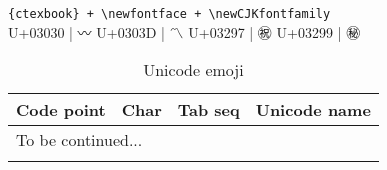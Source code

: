 \documentclass[oneside]{ctexbook} %
\begin{document}
\verb!{ctexbook} + \newfontface + \newCJKfontfamily! \\ 
U+03030 | {\EmojiFontTwo 〰}
U+0303D | {\EmojiFontTwo 〽}
U+03297 | {\EmojiFontTwo ㊗}
U+03299 | {\EmojiFontTwo ㊙}



\begin{longtable}{ccll}
    \caption{Unicode emoji} \\
    \toprule
    Code point & Char & Tab seq & Unicode name \\
    \hline \endhead
    \multicolumn{4}{l}{To be continued...} \\ 
    \midrule \endfoot
    \bottomrule \endlastfoot
    
    
\end{longtable}
\end{document}
